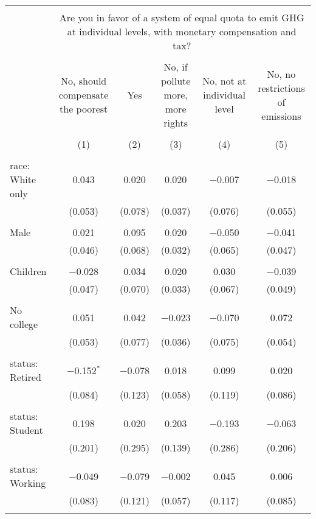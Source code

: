 
\begin{tabular}{@{\extracolsep{5pt}}lccccc} 
\\[-1.8ex]\hline 
\hline \\[-1.8ex] 
 & \multicolumn{5}{c}{Are you in favor of a system of equal quota to emit GHG at individual levels, with monetary compensation and tax?} \\ 
\cline{2-6} 
\\[-1.8ex] & No, should compensate the poorest & Yes & No, if pollute more, more rights & No, not at individual level & No, no restrictions of emissions \\ 
\\[-1.8ex] & (1) & (2) & (3) & (4) & (5)\\ 
\hline \\[-1.8ex] 
 race: White only & 0.043 & 0.020 & 0.020 & $-$0.007 & $-$0.018 \\ 
  & (0.053) & (0.078) & (0.037) & (0.076) & (0.055) \\ 
  & & & & & \\ 
 Male & 0.021 & 0.095 & 0.020 & $-$0.050 & $-$0.041 \\ 
  & (0.046) & (0.068) & (0.032) & (0.065) & (0.047) \\ 
  & & & & & \\ 
 Children & $-$0.028 & 0.034 & 0.020 & 0.030 & $-$0.039 \\ 
  & (0.047) & (0.070) & (0.033) & (0.067) & (0.049) \\ 
  & & & & & \\ 
 No college & 0.051 & 0.042 & $-$0.023 & $-$0.070 & 0.072 \\ 
  & (0.053) & (0.077) & (0.036) & (0.075) & (0.054) \\ 
  & & & & & \\ 
 status: Retired & $-$0.152$^{*}$ & $-$0.078 & 0.018 & 0.099 & 0.020 \\ 
  & (0.084) & (0.123) & (0.058) & (0.119) & (0.086) \\ 
  & & & & & \\ 
 status: Student & 0.198 & 0.020 & 0.203 & $-$0.193 & $-$0.063 \\ 
  & (0.201) & (0.295) & (0.139) & (0.286) & (0.206) \\ 
  & & & & & \\ 
 status: Working & $-$0.049 & $-$0.079 & $-$0.002 & 0.045 & 0.006 \\ 
  & (0.083) & (0.121) & (0.057) & (0.117) & (0.085) \\ 
  & & & & & \\ 

\end{tabular}
